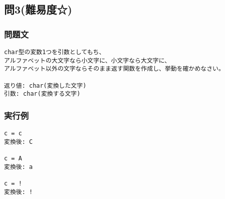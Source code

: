 \subsection{問3(難易度☆)}
\subsubsection{問題文}
\begin{verbatim}
char型の変数1つを引数としてもち、
アルファベットの大文字なら小文字に、小文字なら大文字に、
アルファベット以外の文字ならそのまま返す関数を作成し、挙動を確かめなさい。

返り値: char(変換した文字)
引数: char(変換する文字)
\end{verbatim}

\subsubsection{実行例}
\begin{verbatim}
c = c
変換後: C

c = A
変換後: a

c = !
変換後: !
\end{verbatim}
